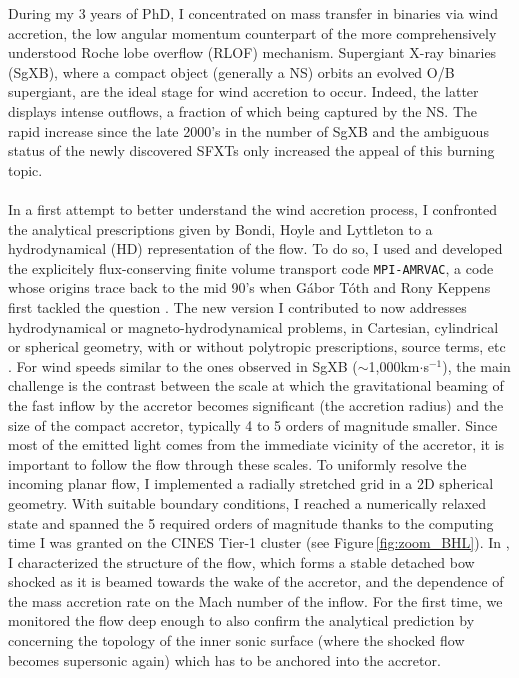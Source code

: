 \documentclass[a4paper,12pt,onecolumn]{article}
\begin{document}
\indent During my 3 years of PhD, I concentrated on mass transfer in binaries via wind accretion, the low angular momentum counterpart of the more comprehensively understood Roche lobe overflow (RLOF) mechanism. Supergiant X-ray binaries (SgXB), where a compact object (generally a NS) orbits an evolved O/B supergiant, are the ideal stage for wind accretion to occur. Indeed, the latter displays intense outflows, a fraction of which being captured by the NS. The rapid increase since the late 2000’s in the number of SgXB \citep{Walter15} and the ambiguous status of the newly discovered SFXTs \citep{Negueruela2006} only increased the appeal of this burning topic.\\ \\
\indent In a first attempt to better understand the wind accretion process, I confronted the analytical prescriptions given by Bondi, Hoyle and Lyttleton \citep[BHL,][]{Hoyle:1939fl,Bondi1944} to a hydrodynamical (HD) representation of the flow. To do so, I used and developed the explicitely flux-conserving finite volume transport code \texttt{MPI-AMRVAC}, a code whose origins trace back to the mid 90’s when G\'abor T\'oth and Rony Keppens first tackled the question \citep{Toth1996,Toth1998}. The new version I contributed to now addresses hydrodynamical or magneto-hydrodynamical problems, in Cartesian, cylindrical or spherical geometry, with or without polytropic prescriptions, source terms, etc \citep{Xia2017}. For wind speeds similar to the ones observed in SgXB ($\sim$1,000km$\cdot$s$^{-1}$), the main challenge is the contrast between the scale at which the gravitational beaming of the fast inflow by the accretor becomes significant (the accretion radius) and the size of the compact accretor, typically 4 to 5 orders of magnitude smaller. Since most of the emitted light comes from the immediate vicinity of the accretor, it is important to follow the flow through these scales. To uniformly resolve the incoming planar flow, I implemented a radially stretched grid in a 2D spherical geometry. With suitable boundary conditions, I reached a numerically relaxed state and spanned the 5 required orders of magnitude thanks to the computing time I was granted on the CINES Tier-1 cluster (see Figure\,\ref{fig:zoom_BHL}). In \cite{ElMellah2015}, I characterized the structure of the flow, which forms a stable detached bow shocked as it is beamed towards the wake of the accretor, and the dependence of the mass accretion rate on the Mach number of the inflow. For the first time, we monitored the flow deep enough to also confirm the analytical prediction by \cite{Foglizzo1997} concerning the topology of the inner sonic surface (where the shocked flow becomes supersonic again) which has to be anchored into the accretor.\\ \\
\end{document}
